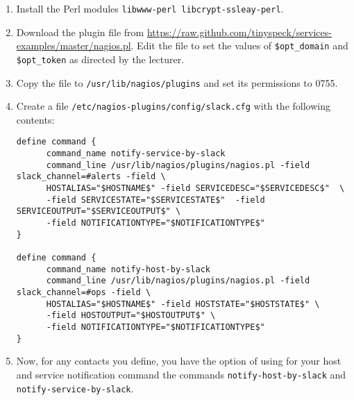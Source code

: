 \documentclass{article}   	%
\begin{document}
\begin{enumerate}
  \item Install the Perl modules \texttt{libwww-perl libcrypt-ssleay-perl}.
  \item  Download the plugin file from \url{https://raw.github.com/tinyspeck/services-examples/master/nagios.pl}.  Edit the file to set
  the values of \texttt{\$opt\_domain} and \texttt{\$opt\_token} as directed by the lecturer. 
  \item Copy the file to \texttt{/usr/lib/nagios/plugins} and set its permissions to 0755.
  \item Create a file \texttt{/etc/nagios-plugins/config/slack.cfg} with the following contents:
       \begin{verbatim}
define command {
      command_name notify-service-by-slack
      command_line /usr/lib/nagios/plugins/nagios.pl -field slack_channel=#alerts -field \
      HOSTALIAS="$HOSTNAME$" -field SERVICEDESC="$SERVICEDESC$"  \
      -field SERVICESTATE="$SERVICESTATE$"  -field SERVICEOUTPUT="$SERVICEOUTPUT$" \
      -field NOTIFICATIONTYPE="$NOTIFICATIONTYPE$"
}

define command {
      command_name notify-host-by-slack
      command_line /usr/lib/nagios/plugins/nagios.pl -field slack_channel=#ops -field \
      HOSTALIAS="$HOSTNAME$" -field HOSTSTATE="$HOSTSTATE$" \
      -field HOSTOUTPUT="$HOSTOUTPUT$" \
      -field NOTIFICATIONTYPE="$NOTIFICATIONTYPE$"
}
\end{verbatim}

  \item Now, for any contacts you define, you have the option of using for your host and service notification command the commands
  \texttt{notify-host-by-slack} and \texttt{notify-service-by-slack}.

\end{enumerate}
\end{document}
